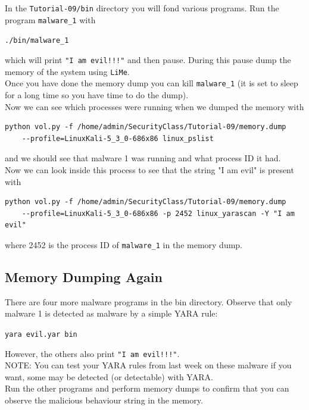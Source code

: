 \documentclass{article}
\begin{document}
\noindent In the \lstinline{Tutorial-09/bin} directory you will fond various programs. Run the
program \lstinline{malware_1} with
\begin{center}
    \lstinline{./bin/malware_1}
\end{center}
\noindent which will print \lstinline{"I am evil!!!"} and then pause. During this pause dump the
memory of the system using \lstinline{LiMe}.\\

\noindent Once you have done the memory dump you can kill \lstinline{malware_1} (it is set
to sleep for a long time so you have time to do the dump).\\

\noindent Now we can see which processes were running when we dumped the memory with
\begin{lstlisting}
python vol.py -f /home/admin/SecurityClass/Tutorial-09/memory.dump
    --profile=LinuxKali-5_3_0-686x86 linux_pslist
\end{lstlisting}
\noindent and we should see that malware 1 was running and what process ID it had.\\

\noindent Now we can look inside this process to see that the string "I am evil" is present with
\begin{lstlisting}
python vol.py -f /home/admin/SecurityClass/Tutorial-09/memory.dump
    --profile=LinuxKali-5_3_0-686x86 -p 2452 linux_yarascan -Y "I am evil"
\end{lstlisting}
\noindent where 2452 is the process ID of \lstinline{malware_1} in the memory dump.
\subsection{Memory Dumping Again}
There are four more malware programs in the bin directory. Observe that
only malware 1 is detected as malware by a simple YARA rule:
\begin{center}
    \lstinline{yara evil.yar bin}
\end{center}
\noindent However, the others also print \lstinline{"I am evil!!!"}.\\

\noindent NOTE: You can test your YARA rules from last week on these malware
if you want, some may be detected (or detectable) with YARA.\\

\noindent Run the other programs and perform memory dumps to confirm that you
can observe the malicious behaviour string in the memory.
\end{document}
